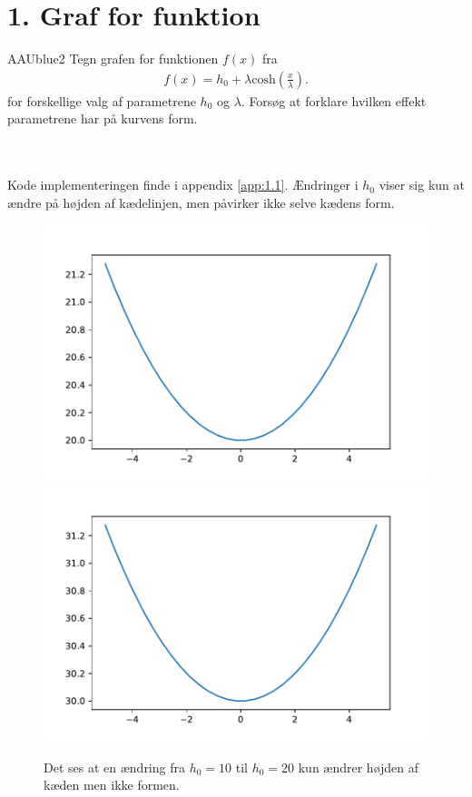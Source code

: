 \section*{1. Graf for funktion}
% 
%
\begin{color}{AAUblue2}
%
Tegn grafen for funktionen $f(x)$ fra 
\begin{align*}
f(x) = h_0 + \lambda \text{cosh} \left( \frac{x}{\lambda} \right).
\end{align*} 
%
for forskellige valg af parametrene $h_0$ og $\lambda$.
Forsøg at forklare hvilken effekt parametrene har på kurvens form.
% 
\end{color}
\\\\
% 
%
Kode implementeringen finde i appendix \ref{app:1.1}.
% 
Ændringer i $h_0$ viser sig kun at ændre på højden af kædelinjen, men påvirker ikke selve kædens form. 
%
\begin{figure}[h!]
\includegraphics[scale=0.5]{code/fig1}
\includegraphics[scale=0.5]{code/fig2}
\caption{Det ses at en ændring fra $h_0=10$ til $h_0=20$ kun ændrer højden af kæden men ikke formen.}
\end{figure}
